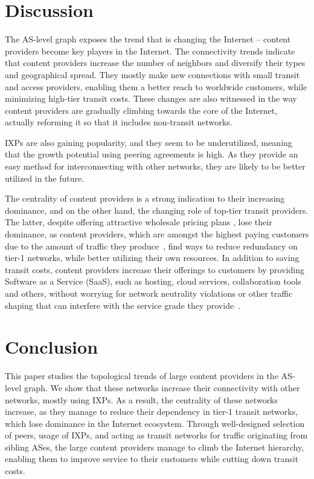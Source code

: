 \documentclass[conference]{IEEEtran}
\begin{document}
\section{Discussion} The AS-level graph exposes the trend that is changing the Internet -- content providers
become key players in the Internet. The connectivity trends indicate that content providers increase
the number of neighbors and diversify their types and geographical spread. They mostly
make new connections with small transit and access providers, enabling them a better reach
to worldwide customers, while minimizing high-tier transit costs. These changes
are also witnessed in the way content providers are gradually climbing towards the core of the Internet,
actually reforming it so that it includes non-transit networks.

IXPs are also gaining popularity, and they seem to be underutilized, meaning that the growth potential
using peering agreements is high. As they provide an easy method for interconnecting with other networks,
they are likely to be better utilized in the future.


The centrality of content providers is a strong indication to their increasing dominance, and on the other hand,
the changing role of top-tier transit providers. The latter, despite offering attractive wholesale pricing plans \cite{tiers},
lose their dominance, as content providers, which are amongst the highest paying customers due to the
amount of traffic they produce~\cite{labovitz}, find ways to reduce redundancy on tier-1 networks, while better
utilizing their own resources. In addition to saving transit costs, content providers increase their offerings
to customers by providing Software as a Service (SaaS), such as hosting, cloud services, collaboration tools and others,
without worrying for network neutrality violations or other traffic shaping that can interfere with the service grade they provide~\cite{amogh2008,beverly2007,udi2011}.

\section{Conclusion}  This paper studies the topological trends of large content providers in the AS-level graph. We show
that these networks increase their connectivity with other networks, mostly using IXPs. As a result, the centrality of these
networks increase, as they manage to reduce their dependency in tier-1 transit networks, which lose dominance in
the Internet ecosystem. Through well-designed selection of peers, usage of IXPs, and acting as transit networks for traffic
originating from sibling ASes, the large content providers manage to
climb the Internet hierarchy, enabling them to improve service to their customers while cutting down transit costs.



\end{document}
